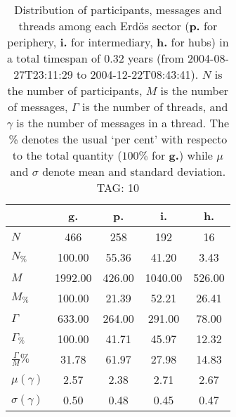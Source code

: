 \begin{table}[h!]
\begin{center}
\begin{tabular}{| l | c | c | c | c |}\hline
 & g. & p. & i. & h. \\\hline
$N$ & 466  & 258  & 192  & 16 \\\hline
$N_{\%}$ & 100.00  & 55.36  & 41.20  & 3.43 \\\hline
$M$ & 1992.00  & 426.00  & 1040.00  & 526.00 \\\hline
$M_{\%}$ & 100.00  & 21.39  & 52.21  & 26.41 \\\hline
$\Gamma$ & 633.00  & 264.00  & 291.00  & 78.00 \\\hline
$\Gamma_{\%}$ & 100.00  & 41.71  & 45.97  & 12.32 \\\hline
$\frac{\Gamma}{M}\%$ & 31.78  & 61.97  & 27.98  & 14.83 \\\hline
$\mu(\gamma)$ & 2.57  & 2.38  & 2.71  & 2.67 \\\hline
$\sigma(\gamma)$ & 0.50  & 0.48  & 0.45  & 0.47 \\\hline
\end{tabular}
\caption{Distribution of participants, messages and threads among each Erd\"os sector ({\bf p.} for periphery, {\bf i.} for intermediary, 
    {\bf h.} for hubs) in a total timespan of 0.32 years (from 2004-08-27T23:11:29 to 2004-12-22T08:43:41). $N$ is the number of participants, $M$ is the number of messages, $\Gamma$ is the number of threads, and $\gamma$ is the number of messages in a thread.
    The \% denotes the usual `per cent' with respecto to the total quantity ($100\%$ for {\bf g.})
    while $\mu$ and $\sigma$ denote mean and standard deviation. TAG: 10}
\end{center}
\end{table}